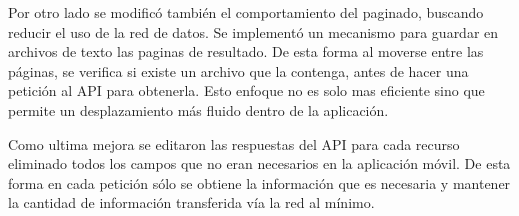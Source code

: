 Por otro lado se modificó también el comportamiento del paginado, buscando reducir el uso de la red de datos. Se implementó un mecanismo para guardar en archivos de texto las paginas de resultado. De esta forma al moverse entre las páginas, se verifica si existe un archivo que la contenga, antes de hacer una petición al API para obtenerla. Esto enfoque no es solo mas eficiente sino que permite un desplazamiento más fluido dentro de la aplicación.

Como ultima mejora se editaron las respuestas del API para cada recurso eliminado todos los campos que no eran necesarios en la aplicación móvil. De esta forma en cada petición sólo se obtiene la información que es necesaria y mantener la cantidad de información transferida vía la red al mínimo.




